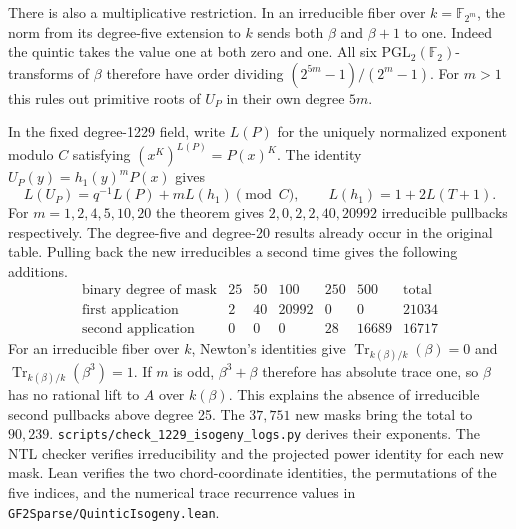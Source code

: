 \documentclass[11pt]{article}
\newcommand{\F}{\mathbb F_2}
\begin{document}
There is also a multiplicative restriction. In an irreducible fiber
over \(k=\mathbb F_{2^m}\), the norm from its degree-five extension to
\(k\) sends both \(\beta\) and \(\beta+1\) to one. Indeed the quintic
takes the value one at both zero and one. All six
\(\mathrm{PGL}_2(\F)\)-transforms of \(\beta\) therefore have order
dividing \((2^{5m}-1)/(2^m-1)\). For \(m>1\) this rules out primitive
roots of \(U_P\) in their own degree \(5m\).

In the fixed degree-1229 field, write \(L(P)\) for the uniquely
normalized exponent modulo \(C\) satisfying \((x^K)^{L(P)}=P(x)^K\).
The identity \(U_P(y)=h_1(y)^m P(x)\) gives
\[
  L(U_P)=q^{-1}L(P)+mL(h_1)\pmod C,\qquad
  L(h_1)=1+2L(T+1).
\]
For \(m=1,2,4,5,10,20\) the theorem gives \(2,0,2,2,40,20992\)
irreducible pullbacks respectively. The degree-five and degree-20
results already occur in the original table. Pulling back the new
irreducibles a second time gives the following additions.
\[
\begin{array}{r|rrrrr|r}
 \text{binary degree of mask} &25&50&100&250&500&\text{total}\\\hline
 \text{first application}&2&40&20992&0&0&21034\\
 \text{second application}&0&0&0&28&16689&16717
\end{array}
\]
For an irreducible fiber over \(k\), Newton's identities give
\(\operatorname{Tr}_{k(\beta)/k}(\beta)=0\) and
\(\operatorname{Tr}_{k(\beta)/k}(\beta^3)=1\).
If \(m\) is odd, \(\beta^3+\beta\) therefore has absolute trace one,
so \(\beta\) has no rational lift to \(A\) over \(k(\beta)\).
This explains the absence of irreducible second pullbacks above degree 25.
The \(37{,}751\) new masks bring the total to \(90{,}239\).
\nolinkurl{scripts/check_1229_isogeny_logs.py} derives their exponents.
The NTL checker verifies irreducibility and the projected power identity
for each new mask. Lean verifies the two chord-coordinate identities,
the permutations of the five indices, and the numerical trace recurrence
values in \nolinkurl{GF2Sparse/QuinticIsogeny.lean}.
\end{document}
